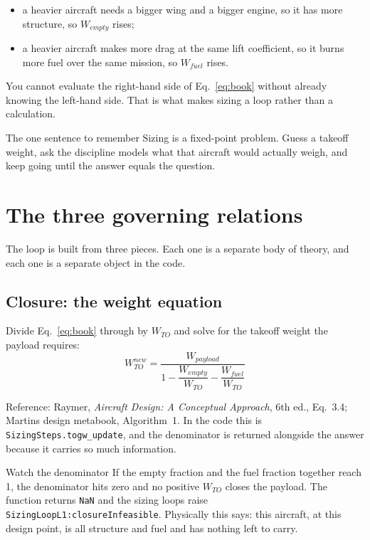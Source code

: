 \documentclass[11pt, a4paper]{article}
\begin{document}
\begin{itemize}[nosep]
  \item a heavier aircraft needs a bigger wing and a bigger engine, so it has
        more structure, so $W_{empty}$ rises;
  \item a heavier aircraft makes more drag at the same lift coefficient, so it
        burns more fuel over the same mission, so $W_{fuel}$ rises.
\end{itemize}

\noindent You cannot evaluate the right-hand side of Eq.~\ref{eq:book} without
already knowing the left-hand side. That is what makes sizing a loop rather
than a calculation.

\begin{keybox}{The one sentence to remember}
Sizing is a fixed-point problem. Guess a takeoff weight, ask the discipline
models what that aircraft would actually weigh, and keep going until the
answer equals the question.
\end{keybox}

\section{The three governing relations}

The loop is built from three pieces. Each one is a separate body of theory,
and each one is a separate object in the code.

\subsection{Closure: the weight equation}

Divide Eq.~\ref{eq:book} through by $W_{TO}$ and solve for the takeoff weight
the payload requires:
\begin{equation}
\boxed{\;W_{TO}^{new} = \frac{W_{payload}}
       {1 - \dfrac{W_{empty}}{W_{TO}} - \dfrac{W_{fuel}}{W_{TO}}}\;}
\label{eq:closure}
\end{equation}

\noindent Reference: Raymer, \emph{Aircraft Design: A Conceptual Approach},
6th ed., Eq.~3.4; Martins design metabook, Algorithm~1. In the code this is
\texttt{SizingSteps.togw\_update}, and the denominator is returned alongside
the answer because it carries so much information.

\begin{warnbox}{Watch the denominator}
If the empty fraction and the fuel fraction together reach 1, the denominator
hits zero and no positive $W_{TO}$ closes the payload. The function returns
\texttt{NaN} and the sizing loops raise
\texttt{SizingLoopL1:closureInfeasible}. Physically this says: this aircraft,
at this design point, is all structure and fuel and has nothing left to carry.
\end{warnbox}
\end{document}
